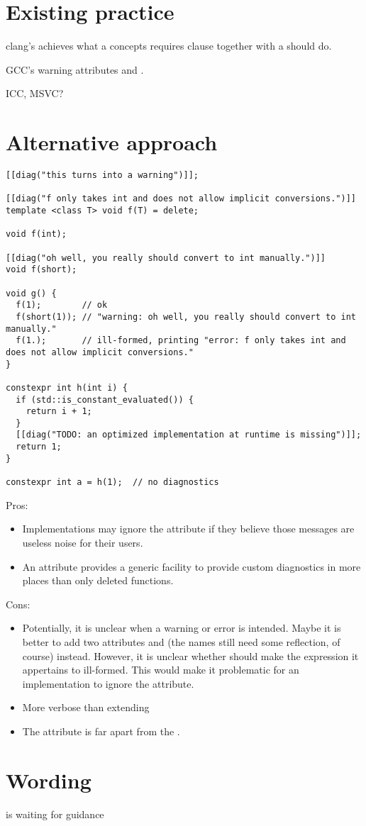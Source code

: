 \section{Existing practice}
clang's  achieves what a concepts requires clause together with a  should do.

GCC's warning attributes and .

ICC, MSVC?


\section{Alternative approach}
\begin{lstlisting}[style=Vc]
[[diag("this turns into a warning")]];

[[diag("f only takes int and does not allow implicit conversions.")]]
template <class T> void f(T) = delete;

void f(int);

[[diag("oh well, you really should convert to int manually.")]]
void f(short);

void g() {
  f(1);        // ok
  f(short(1)); // "warning: oh well, you really should convert to int manually."
  f(1.);       // ill-formed, printing "error: f only takes int and does not allow implicit conversions."
}

constexpr int h(int i) {
  if (std::is_constant_evaluated()) {
    return i + 1;
  }
  [[diag("TODO: an optimized implementation at runtime is missing")]];
  return 1;
}

constexpr int a = h(1);  // no diagnostics
\end{lstlisting}

Pros:
\begin{itemize}
  \item Implementations may ignore the attribute if they believe those messages are useless noise for their users.
  \item An attribute provides a generic facility to provide custom diagnostics in more places than only deleted functions.
\end{itemize}
Cons:
\begin{itemize}
  \item Potentially, it is unclear when a warning or error is intended.
    Maybe it is better to add two attributes  and  (the names still need some reflection, of course) instead.
    However, it is unclear whether  should make the expression it appertains to ill-formed.
    This would make it problematic for an implementation to ignore the attribute.
  \item More verbose than extending 
  \item The attribute is far apart from the .
\end{itemize}

\section{Wording}
is waiting for guidance


